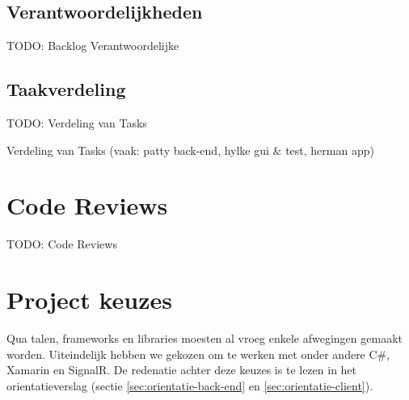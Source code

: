 \subsection{Verantwoordelijkheden}

{\par \bigskip \par \color{red} TODO: Backlog Verantwoordelijke \par \bigskip \par }

\subsection{Taakverdeling}

{\par \bigskip \par \color{red} TODO: Verdeling van Tasks \par \bigskip \par }

Verdeling van Tasks (vaak: patty back-end, hylke gui \& test, herman app)

\section{Code Reviews}

{\par \bigskip \par \color{red} TODO: Code Reviews \par \bigskip \par }

\section{Project keuzes}
Qua talen, frameworks en libraries moesten al vroeg enkele afwegingen gemaakt worden. Uiteindelijk hebben we gekozen om te werken met onder andere C\#, Xamarin en SignalR. De redenatie achter deze keuzes is te lezen in het orientatieverslag (sectie \ref{sec:orientatie-back-end}
en \ref{sec:orientatie-client}).


